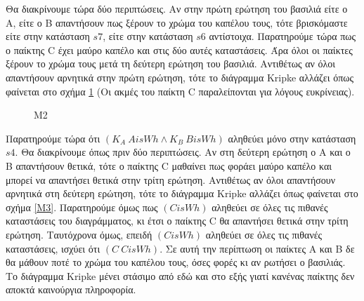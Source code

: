 Θα διακρίνουμε τώρα δύο περιπτώσεις. Αν στην πρώτη ερώτηση του βασιλιά είτε ο A, είτε ο B απαντήσουν πως ξέρουν το χρώμα του καπέλου τους, τότε βρισκόμαστε είτε στην κατάσταση $s7$, είτε στην κατάσταση $s6$ αντίστοιχα. Παρατηρούμε τώρα πως ο παίκτης C έχει μαύρο καπέλο και στις δύο αυτές καταστάσεις. Άρα όλοι οι παίκτες ξέρουν το χρώμα τους μετά τη δεύτερη ερώτηση του βασιλιά. Αντιθέτως αν όλοι απαντήσουν αρνητικά στην πρώτη ερώτηση, τότε το διάγραμμα Kripke αλλάζει όπως φαίνεται στο σχήμα \ref{M2} (Οι ακμές του παίκτη C παραλείπονται για λόγους ευκρίνειας).

\begin{figure}[h!]
\centering
{}
\caption{M2}
\label{M2}
\end{figure}

Παρατηρούμε τώρα ότι $(K_A\ AisWh \land K_B\ BisWh)$ αληθεύει μόνο στην κατάσταση $s4$. Θα διακρίνουμε όπως πριν δύο περιπτώσεις. Αν στη δεύτερη ερώτηση ο A και ο B απαντήσουν θετικά, τότε ο παίκτης C μαθαίνει πως φοράει μαύρο καπέλο και μπορεί να απαντήσει θετικά στην τρίτη ερώτηση. Αντιθέτως αν όλοι απαντήσουν αρνητικά στη δεύτερη ερώτηση, τότε το διάγραμμα Kripke αλλάζει όπως φαίνεται στο σχήμα \ref{M3}. Παρατηρούμε όμως πως $(CisWh)$ αληθεύει σε όλες τις πιθανές καταστάσεις του διαγράμματος, κι έτσι ο παίκτης C θα απαντήσει θετικά στην τρίτη ερώτηση. Ταυτόχρονα όμως, επειδή $(CisWh)$ αληθεύει σε όλες τις πιθανές καταστάσεις, ισχύει ότι $(C\ CisWh)$. Σε αυτή την περίπτωση οι παίκτες A και B δε θα μάθουν ποτέ το χρώμα του καπέλου τους, όσες φορές κι αν ρωτήσει ο βασιλιάς. Το διάγραμμα Kripke μένει στάσιμο από εδώ και στο εξής γιατί κανένας παίκτης δεν αποκτά καινούργια πληροφορία.

